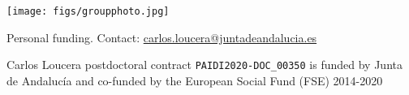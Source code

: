 \documentclass[compress,ignorenonframetext,aspectratio=1610]{beamer}
\begin{document}
	\begin{frame}{}
		\begin{center}
		\texttt{[image: figs/groupphoto.jpg]}
		\end{center}
	\end{frame}


	\begin{frame}{Personal funding. Contact: \url{carlos.loucera@juntadeandalucia.es}}


		\vspace{0.3cm}

		Carlos Loucera postdoctoral contract \texttt{PAIDI2020-DOC\_00350} is funded by Junta de Andalucía and co-funded by the European Social Fund (FSE) 2014-2020

		\vspace{0.3cm}

		\begin{center}
		\end{center}
	\end{frame}
\end{document}
